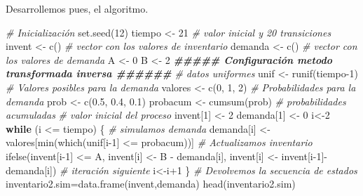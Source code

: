 \documentclass[
]{book}
\newenvironment{Shaded}{\begin{snugshade}}{\end{snugshade}}
\newcommand{\CommentTok}[1]{\textcolor[rgb]{0.56,0.35,0.01}{\textit{#1}}}
\newcommand{\ControlFlowTok}[1]{\textcolor[rgb]{0.13,0.29,0.53}{\textbf{#1}}}
\newcommand{\DecValTok}[1]{\textcolor[rgb]{0.00,0.00,0.81}{#1}}
\newcommand{\DocumentationTok}[1]{\textcolor[rgb]{0.56,0.35,0.01}{\textbf{\textit{#1}}}}
\newcommand{\FloatTok}[1]{\textcolor[rgb]{0.00,0.00,0.81}{#1}}
\newcommand{\FunctionTok}[1]{\textcolor[rgb]{0.00,0.00,0.00}{#1}}
\newcommand{\NormalTok}[1]{#1}
\newcommand{\OtherTok}[1]{\textcolor[rgb]{0.56,0.35,0.01}{#1}}
\newcommand{\SpecialCharTok}[1]{\textcolor[rgb]{0.00,0.00,0.00}{#1}}
\theoremstyle{definition}
\theoremstyle{definition}
\theoremstyle{definition}
\theoremstyle{definition}
\theoremstyle{remark}
\begin{document}
Desarrollemos pues, el algoritmo.

\begin{Shaded}
\begin{Highlighting}[]
\CommentTok{\# Inicialización}
\FunctionTok{set.seed}\NormalTok{(}\DecValTok{12}\NormalTok{)}
\NormalTok{tiempo }\OtherTok{\textless{}{-}} \DecValTok{21} \CommentTok{\# valor inicial y 20 transiciones}
\NormalTok{invent }\OtherTok{\textless{}{-}} \FunctionTok{c}\NormalTok{()  }\CommentTok{\# vector con los valores de inventario}
\NormalTok{demanda }\OtherTok{\textless{}{-}} \FunctionTok{c}\NormalTok{() }\CommentTok{\# vector con los valores de demanda}
\NormalTok{A }\OtherTok{\textless{}{-}} \DecValTok{0}
\NormalTok{B }\OtherTok{\textless{}{-}} \DecValTok{2}
\DocumentationTok{\#\#\#\#\# Configuración metodo transformada inversa \#\#\#\#\#\#}
\CommentTok{\# datos uniformes}
\NormalTok{unif }\OtherTok{\textless{}{-}} \FunctionTok{runif}\NormalTok{(tiempo}\DecValTok{{-}1}\NormalTok{)}
\CommentTok{\# Valores posibles para la demanda}
\NormalTok{valores }\OtherTok{\textless{}{-}} \FunctionTok{c}\NormalTok{(}\DecValTok{0}\NormalTok{, }\DecValTok{1}\NormalTok{, }\DecValTok{2}\NormalTok{)}
\CommentTok{\# Probabilidades para la demanda}
\NormalTok{prob }\OtherTok{\textless{}{-}} \FunctionTok{c}\NormalTok{(}\FloatTok{0.5}\NormalTok{, }\FloatTok{0.4}\NormalTok{, }\FloatTok{0.1}\NormalTok{)}
\NormalTok{probacum }\OtherTok{\textless{}{-}} \FunctionTok{cumsum}\NormalTok{(prob)  }\CommentTok{\# probabilidades acumuladas}
\CommentTok{\# valor inicial del proceso}
\NormalTok{invent[}\DecValTok{1}\NormalTok{] }\OtherTok{\textless{}{-}} \DecValTok{2}
\NormalTok{demanda[}\DecValTok{1}\NormalTok{] }\OtherTok{\textless{}{-}} \DecValTok{0}
\NormalTok{i}\OtherTok{\textless{}{-}}\DecValTok{2}
\ControlFlowTok{while}\NormalTok{ (i }\SpecialCharTok{\textless{}=}\NormalTok{ tiempo)}
\NormalTok{\{}
  \CommentTok{\# simulamos demanda}
\NormalTok{  demanda[i] }\OtherTok{\textless{}{-}}\NormalTok{ valores[}\FunctionTok{min}\NormalTok{(}\FunctionTok{which}\NormalTok{(unif[i}\DecValTok{{-}1}\NormalTok{] }\SpecialCharTok{\textless{}=}\NormalTok{ probacum))] }
  \CommentTok{\# Actualizamos inventario}
  \FunctionTok{ifelse}\NormalTok{(invent[i}\DecValTok{{-}1}\NormalTok{] }\SpecialCharTok{\textless{}=}\NormalTok{ A, }
\NormalTok{         invent[i] }\OtherTok{\textless{}{-}}\NormalTok{ B }\SpecialCharTok{{-}}\NormalTok{ demanda[i], }
\NormalTok{         invent[i] }\OtherTok{\textless{}{-}}\NormalTok{ invent[i}\DecValTok{{-}1}\NormalTok{]}\SpecialCharTok{{-}}\NormalTok{demanda[i])}
  \CommentTok{\# iteración siguiente}
\NormalTok{  i}\OtherTok{\textless{}{-}}\NormalTok{i}\SpecialCharTok{+}\DecValTok{1}
\NormalTok{\}}
\CommentTok{\# Devolvemos la secuencia de estados }
\NormalTok{inventario2.sim}\OtherTok{=}\FunctionTok{data.frame}\NormalTok{(invent,demanda)}
\FunctionTok{head}\NormalTok{(inventario2.sim)}
\end{Highlighting}
\end{Shaded}
\end{document}
